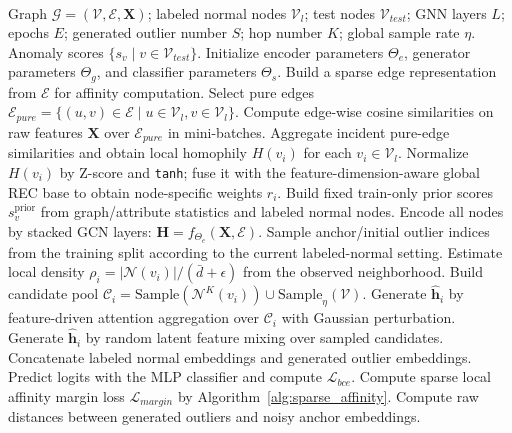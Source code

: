 ﻿﻿﻿﻿    \documentclass[conference, onecolumn]{IEEEtran}
\begin{document}
    \begin{algorithm}[htbp]
    \caption{DMC-GGAD}
    \label{alg:dmc_ggad_training}
    \footnotesize
    \begin{algorithmic}[1]
    \REQUIRE Graph $\mathcal{G}=(\mathcal{V},\mathcal{E},\mathbf{X})$; labeled normal nodes $\mathcal{V}_l$; test nodes $\mathcal{V}_{test}$; GNN layers $L$; epochs $E$; generated outlier number $S$; hop number $K$; global sample rate $\eta$.
    \ENSURE Anomaly scores $\{s_v\mid v\in\mathcal{V}_{test}\}$.
    \STATE Initialize encoder parameters $\Theta_e$, generator parameters $\Theta_g$, and classifier parameters $\Theta_s$.
    \STATE Build a sparse edge representation from $\mathcal{E}$ for affinity computation.
    \STATE Select pure edges $\mathcal{E}_{pure}=\{(u,v)\in\mathcal{E}\mid u\in\mathcal{V}_l, v\in\mathcal{V}_l\}$.
    \STATE Compute edge-wise cosine similarities on raw features $\mathbf{X}$ over $\mathcal{E}_{pure}$ in mini-batches.
    \STATE Aggregate incident pure-edge similarities and obtain local homophily $H(v_i)$ for each $v_i\in\mathcal{V}_l$.
    \STATE Normalize $H(v_i)$ by Z-score and \texttt{tanh}; fuse it with the feature-dimension-aware global REC base to obtain node-specific weights $r_i$.
    \STATE Build fixed train-only prior scores $s_v^{\mathrm{prior}}$ from graph/attribute statistics and labeled normal nodes.
        \STATE Encode all nodes by stacked GCN layers: $\mathbf{H}=f_{\Theta_e}(\mathbf{X},\mathcal{E})$.
        \STATE Sample anchor/initial outlier indices from the training split according to the current labeled-normal setting.
            \STATE Estimate local density $\rho_i=|\mathcal{N}(v_i)|/(\bar{d}+\epsilon)$ from the observed neighborhood.
            \STATE Build candidate pool $\mathcal{C}_i=\mathrm{Sample}(\mathcal{N}^{K}(v_i))\cup\mathrm{Sample}_{\eta}(\mathcal{V})$.
                \STATE Generate $\hat{\mathbf{h}}_i$ by feature-driven attention aggregation over $\mathcal{C}_i$ with Gaussian perturbation.
            \ELSE
                \STATE Generate $\hat{\mathbf{h}}_i$ by random latent feature mixing over sampled candidates.
            \ENDIF
        \ENDFOR
        \STATE Concatenate labeled normal embeddings and generated outlier embeddings.
        \STATE Predict logits with the MLP classifier and compute $\mathcal{L}_{bce}$.
        \STATE Compute sparse local affinity margin loss $\mathcal{L}_{margin}$ by Algorithm~\ref{alg:sparse_affinity}.
        \STATE Compute raw distances between generated outliers and noisy anchor embeddings.

\end{algorithmic}
\end{algorithm}
\end{document}
